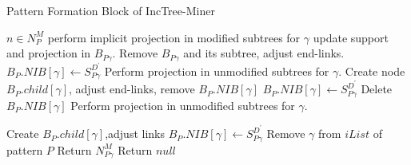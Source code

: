 \begin{algorithm}[!thb]
      \scriptsize
      \caption{Pattern Formation Block of IncTree-Miner}
      \label{algorithm:pattern_formation_inctree_miner}
      \begin{algorithmic}[1]
           \State \forall $n \in N_{P}^{M}$ perform implicit projection in modified subtrees for $\gamma$
           \State {}
                 update support and projection in $B_{P\gamma}$.
                \Else  {}
                    \State Remove $B_{P\gamma}$ and its subtree, adjust end-links.
                    \State {}
                    \State $B_{P}.NIB[\gamma] \gets S_{P\gamma}^{D^{\prime}}$
                    \EndIf
                \EndIf
                \State {}
                    \State Perform projection in unmodified subtrees for $\gamma$.
                    \State Create node $B_{P}.child[\gamma]$, adjust end-links, remove  $B_{P}.NIB[\gamma]$
                \Else {}
                        \State $B_{P}.NIB[\gamma]\gets S_{P\gamma}^{D^{\prime}}$
                    \Else {}
                        \State \text{ }Delete  $B_{P}.NIB[\gamma]$
                    \EndIf
                \EndIf
                    \State  {}
                    \State Perform projection in unmodified subtrees for $\gamma$.

                    \State Create $B_{P}.child[\gamma]$,adjust links
                    \Else {}
                            \State $B_{P}.NIB[\gamma] \gets S_{P\gamma}^{D^{\prime}}$
                        \EndIf
                            \State {}
                            \State Remove $\gamma$ from $iList$ of pattern $P$
                        \EndIf
                    \EndIf
                \EndIf
            \EndIf
            \State{}
            \State Return $N_{P\gamma}^{M}$
        \Else \text{ }Return $null$
        \EndIf
        \EndProcedure
      \end{algorithmic}
\end{algorithm}

